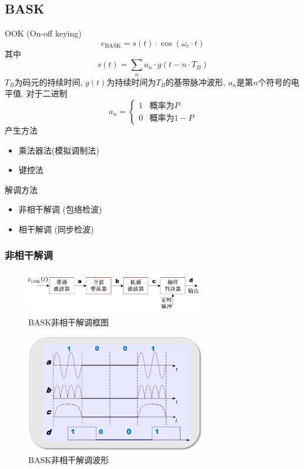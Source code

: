 \documentclass[a4paper]{report}
\begin{document}
\subsection{BASK}
OOK (On-off keying)
\begin{equation}
  e_{\text{BASK}}=s(t)\cdot \cos(\omega_c\cdot t)
\end{equation}
其中\begin{equation}
  s(t)=\displaystyle\sum_{n}a_n\cdot g(t-n\cdot T_B)
\end{equation}
$T_B$为码元的持续时间, $g(t)$为持续时间为$T_B$的基带脉冲波形, $a_n$是第$n$个符号的电平值, 对于二进制
\begin{equation}
  a_n=\begin{cases}
    1 &\text{概率为}P\\
    0 &\text{概率为}1-P
  \end{cases}
\end{equation}
产生方法\begin{itemize}
  \item 乘法器法(模拟调制法)
  \item 键控法
\end{itemize}
解调方法\begin{itemize}
  \item 非相干解调 (包络检波)
  \item 相干解调 (同步检波)
\end{itemize}
\subsubsection{非相干解调}
\begin{figure}[H]
\centering
\includegraphics[width=0.7\textwidth]{bask_non_co.png}
\caption{BASK非相干解调框图}
\end{figure}
\begin{figure}[H]
\centering
\includegraphics[width=0.7\textwidth]{bask_non_co_wave.png}
\caption{BASK非相干解调波形}
\end{figure}
\end{document}
